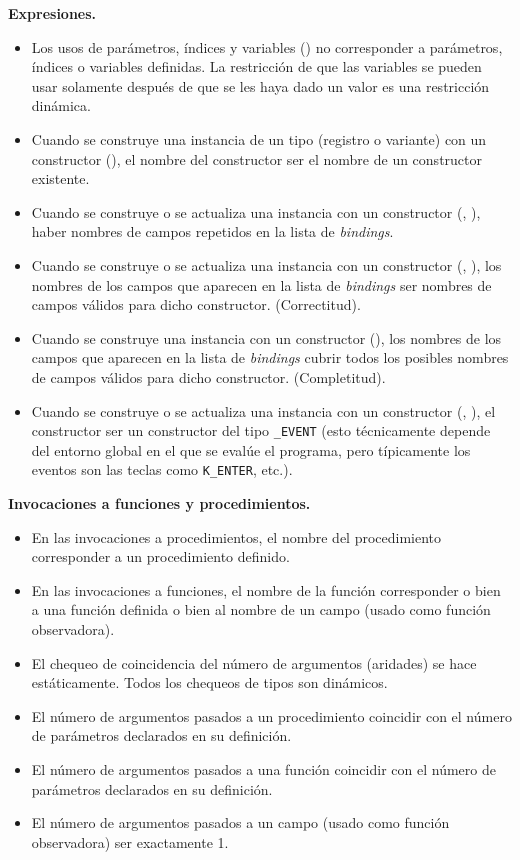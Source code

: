 \documentclass{article}
\begin{document}
{\bf Expresiones.}
\begin{itemize}
\item Los usos de par\'ametros, \'indices y variables () \PUEDEN no corresponder a par\'ametros, \'indices o variables definidas.
      La restricci\'on de que las variables se pueden usar solamente despu\'es de que se les haya dado un valor es una restricci\'on din\'amica.
\item Cuando se construye una instancia de un tipo (registro o variante) con un constructor (),
      el nombre del constructor \DEBE ser el nombre de un constructor existente.
\item Cuando se construye o se actualiza una instancia con un constructor (, ),
      \NOPUEDE haber nombres de campos repetidos en la lista de {\em bindings}.
\item Cuando se construye o se actualiza una instancia con un constructor (, ),
      los nombres de los campos que aparecen en la lista de {\em bindings}
      \DEBEN ser nombres de campos v\'alidos para dicho constructor. (Correctitud).
\item Cuando se construye una instancia con un constructor (),
      los nombres de los campos que aparecen en la lista de {\em bindings}
      \DEBEN cubrir todos los posibles nombres de campos v\'alidos para dicho constructor. (Completitud).
\item Cuando se construye o se actualiza una instancia con un constructor (, ),
      el constructor \NOPUEDE ser un constructor del tipo \texttt{\_EVENT} (esto t\'ecnicamente depende
      del entorno global en el que se eval\'ue el programa, pero t\'ipicamente
      los eventos son las teclas como \texttt{K\_ENTER}, etc.).
\end{itemize}

{\bf Invocaciones a funciones y procedimientos.}
\begin{itemize}
\item En las invocaciones a procedimientos, el nombre del procedimiento \DEBE corresponder a un procedimiento definido.
\item En las invocaciones a funciones, el nombre de la funci\'on \DEBE corresponder
      o bien a una funci\'on definida o bien al nombre de un campo (usado como funci\'on observadora).
\item El chequeo de coincidencia del n\'umero de argumentos (aridades) se hace est\'aticamente.
      Todos los chequeos de tipos son din\'amicos.
\item El n\'umero de argumentos pasados a un procedimiento \DEBE coincidir con el n\'umero de par\'ametros declarados en su definici\'on.
\item El n\'umero de argumentos pasados a una funci\'on \DEBE coincidir con el n\'umero de par\'ametros declarados en su definici\'on.
\item El n\'umero de argumentos pasados a un campo (usado como funci\'on observadora) \DEBE ser exactamente 1.
\end{itemize}
\end{document}
